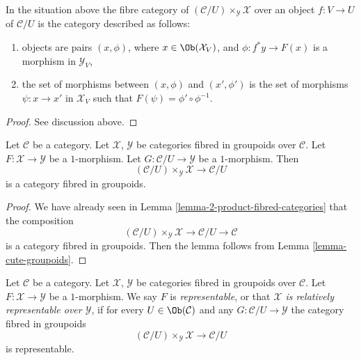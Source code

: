 \begin{lemma}
\label{lemma-identify-fibre-product}
In the situation above the fibre category of
$(\mathcal{C}/U) \times_\mathcal{Y} \mathcal{X}$ over
an object $f : V \to U$ of $\mathcal{C}/U$
is the category described as follows:
\begin{enumerate}
\item objects are pairs $(x, \phi)$,
where $x \in \Ob(\mathcal{X}_V)$, and
$\phi : f^*y \to F(x)$ is a morphism in $\mathcal{Y}_V$,
\item the set of morphisms between $(x, \phi)$ and $(x', \phi')$
is the set of morphisms $\psi : x \to x'$ in $\mathcal{X}_V$
such that $F(\psi) = \phi' \circ \phi^{-1}$.
\end{enumerate}
\end{lemma}

\begin{proof}
See discussion above.
\end{proof}

\begin{lemma}
\label{lemma-prepare-representable-map-stack-in-groupoids}
Let $\mathcal{C}$ be a category.
Let $\mathcal{X}$, $\mathcal{Y}$ be categories fibred in groupoids
over $\mathcal{C}$.
Let $F : \mathcal{X} \to \mathcal{Y}$ be a $1$-morphism.
Let $G : \mathcal{C}/U \to \mathcal{Y}$ be a $1$-morphism.
Then
$$
(\mathcal{C}/U) \times_\mathcal{Y} \mathcal{X}
\longrightarrow
\mathcal{C}/U
$$
is a category fibred in groupoids.
\end{lemma}

\begin{proof}
We have already seen in Lemma \ref{lemma-2-product-fibred-categories}
that the composition
$$
(\mathcal{C}/U) \times_\mathcal{Y} \mathcal{X}
\longrightarrow
\mathcal{C}/U
\longrightarrow
\mathcal{C}
$$
is a category fibred in groupoids. Then the lemma follows from
Lemma \ref{lemma-cute-groupoids}.
\end{proof}

\begin{definition}
\label{definition-representable-map-categories-fibred-in-groupoids}
Let $\mathcal{C}$ be a category.
Let $\mathcal{X}$, $\mathcal{Y}$ be categories fibred in groupoids
over $\mathcal{C}$.
Let $F : \mathcal{X} \to \mathcal{Y}$ be a $1$-morphism.
We say $F$ is {\it representable}, or that
{\it $\mathcal{X}$ is relatively representable over $\mathcal{Y}$},
if for every $U \in \Ob(\mathcal{C})$
and any $G : \mathcal{C}/U \to \mathcal{Y}$
the category fibred in groupoids
$$
(\mathcal{C}/U) \times_\mathcal{Y} \mathcal{X}
\longrightarrow
\mathcal{C}/U
$$
is representable.
\end{definition}

